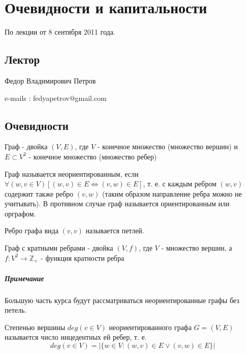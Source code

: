\chapter{Очевидности и капитальности}

По лекции от 8 сентября 2011 года.

\section{Лектор}

{\large Федор Владимирович Петров}
\par\bigskip

e-mails : \hfill fedyapetrov@gmail.com
\par\bigskip

\section{Очевидности}

\begin{Def}
	Граф - двойка $ (V , E) $, где $ V $ - конечное множество (множество вершин) и $ E \subset V^2 $ - конечное множество (множество ребер)
\end{Def}

\begin{Def}
	Граф называется неориентированным, если $ \forall (w,v \in V) \left [ (w, v) \in E \Leftrightarrow (v, w) \in E \right ] $, т. е. с каждым ребром $ (w, v) $ содержит также ребро $ (v, w) $ (таким образом направление ребра можно не учитывать). В противном случае граф называется ориентированным или орграфом.
\end{Def}

\begin{Def}
	Ребро графа вида $ (v, v) $ называется петлей.
\end{Def}

\begin{Def}
	Граф с кратными ребрами - двойка $ ( V, f ) $, где $ V $ - множество вершин, а $ f: V^2 \rightarrow \mathbb{Z _+} $ - функция кратности ребра
\end{Def}

\paragraph{Примечание}

Большую часть курса будут рассматриваться неориентированные графы без петель.

\begin{Def}
	Степенью вершины $deg (v \in V)$ неориентированного графа $ G = (V,E) $ называется число инцедентных ей ребер, т. е. \[ deg (v \in V) = \left| \{ w \in V : (w, v) \in E \lor (v, w) \in E \} \right| \]
\end{Def}

